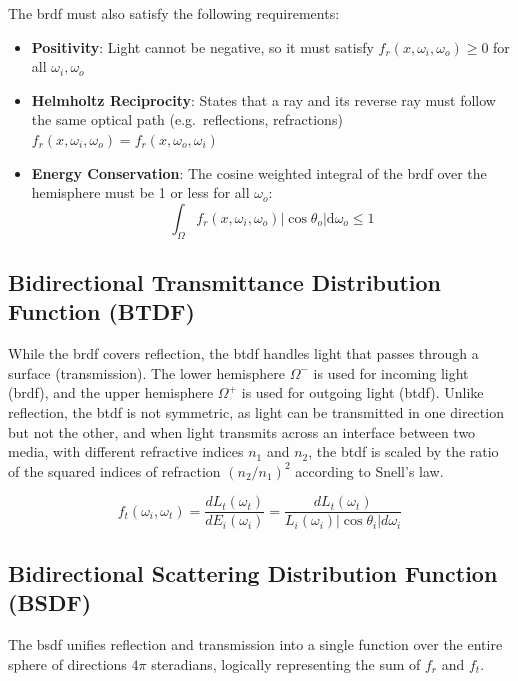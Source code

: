 The \gls{brdf} must also satisfy the following requirements:
\begin{itemize}
    \item \textbf{Positivity}: Light cannot be negative, so it must satisfy $f_r(x, \omega_i, \omega_o) \geq 0$ for all $\omega_i, \omega_o$
    \item \textbf{Helmholtz Reciprocity}: States that a ray and its reverse ray must follow the same optical path 
        (e.g.\ reflections, refractions) $f_r(x, \omega_i, \omega_o) = f_r(x, \omega_o, \omega_i)$
    \item \textbf{Energy Conservation}: The cosine weighted integral of the \gls{brdf} over the hemisphere must be
            1 or less for all $\omega_o$:
    \[
        \int_{\Omega} f_r(x, \omega_i, \omega_o) |\cos\theta_o| \mathrm{d}\omega_o \leq 1
    \]
\end{itemize}

\subsection{Bidirectional Transmittance Distribution Function (BTDF)}\label{subsec:btdf}

While the \gls{brdf} covers reflection, the \gls{btdf} handles light that passes through a surface (transmission).
The lower hemisphere $\Omega^-$ is used for incoming light (\gls{brdf}), 
and the upper hemisphere $\Omega^+$ is used for outgoing light (\gls{btdf}).
Unlike reflection, the \gls{btdf} is not symmetric, as light can be transmitted in one direction but not the other,
and when light transmits across an interface between two media, with different refractive indices $n_1$ and $n_2$,
the \gls{btdf} is scaled by the ratio of the squared indices of refraction ${({n_2}/{n_1})}^2$ 
according to Snell's law.~\cite{136913.136929,Born_Wolf_Bhatia_Clemmow_Gabor_Stokes_Taylor_Wayman_Wilcock_1999}

\[
    f_t(\omega_i, \omega_t) = \frac{d L_t(\omega_t)}{d E_i(\omega_i)} = \frac{d L_t(\omega_t)}{L_i(\omega_i) |\cos\theta_i| d\omega_i}
\]


\subsection{Bidirectional Scattering Distribution Function (BSDF)}\label{subsec:bsdf}

The \gls{bsdf} unifies reflection and transmission into a single function
over the entire sphere of directions $4\pi$ steradians,
logically representing the sum of $f_r$ and $f_t$.~\cite{Bartell1980BSDF,Pharr2016PBR}

